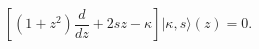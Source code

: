 \begin{equation}
\left[(1+z^2)\frac{d}{dz}+2sz-\kappa\right]|\kappa,s\rangle(z)=0.
\label{eigeneq}
\end{equation}

